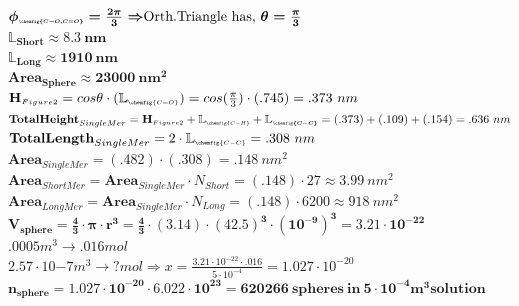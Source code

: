 \documentclass[journal=jacsat,manuscript=article]{achemso}
\begin{document}
$\boldsymbol{\phi_{\scalebox{.7}{$\scriptscriptstyle \chemfig{C-O,C=O}$}}=\frac{2\pi}{3}\Rightarrow$Orth.Triangle has, $\theta=\frac{\pi}{3}}$\\
$\boldsymbol{\mathbb{L}_{\scriptscriptstyle Short}\approx8.3~nm}$\\
$\boldsymbol{\mathbb{L}_{\scriptscriptstyle Long}\approx 1910~nm}$\\
$\boldsymbol{\textbf{Area}_{\scriptscriptstyle Sphere} \approx 23000~nm^2}$\\
$\textbf{H}_{\scriptscriptstyle Figure2}=cos\theta \cdot (\mathbb{L}_{\scalebox{.82}{$\scriptscriptstyle \chemfig{C=O}$}})=cos(\frac{\pi}{3}) \cdot(.745)=.373~nm$\\
$\textbf{TotalHeight}_{SingleMer}=\textbf{H}_{\scriptscriptstyle Figure2}+\mathbb{L}_{\scalebox{.82}{$\scriptscriptstyle \chemfig{C-H}$}}+\boldsymbol{\mathbb{L}_{\scalebox{.82}{$\scriptscriptstyle \chemfig{C-C}$}}}=(.373)+(.109)+(.154)=.636~nm$\\
$\textbf{TotalLength}_{SingleMer} = 2 \cdot \mathbb{L}_{\scalebox{.82}{$\scriptscriptstyle \chemfig{C-C}$}} = .308~nm$\\
$\textbf{Area}_{\scriptscriptstyle SingleMer} =(.482) \cdot(.308) =.148~nm^2$\\
$\textbf{Area}_{\scriptscriptstyle ShortMer} =\textbf{Area}_{\scriptscriptstyle SingleMer}\cdot N_{Short}=(.148)\cdot 27\approx 3.99 ~nm^2$\\
$\textbf{Area}_{\scriptscriptstyle LongMer} =\textbf{Area}_{\scriptscriptstyle SingleMer}\cdot N_{Long}=(.148)\cdot 6200 \approx 918~nm^2$\\
$\boldsymbol{V_{sphere}=\frac{4}{3}\cdot\pi\cdot r^{3}=\frac{4}{3}\cdot (3.14)\cdot(42.5)^3 \cdot (10^{-9})^3=3.21\cdot 10^{-22}}$\\
$.0005 m^3 \rightarrow .016mol$\\
$2.57\cdot 10{-7} m^3 \rightarrow ?mol \Rightarrow x=\frac{3.21\cdot10^{-22}\cdot.016}{5\cdot10^{-4}}=1.027\cdot10^{-20}$\\
$\boldsymbol{n_{sphere}=1.027\cdot 10^{-20}\cdot 6.022 \cdot 10^{23}=620266~spheres~in~5\cdot 10^{-4}m^3 solution}$




\end{document}
